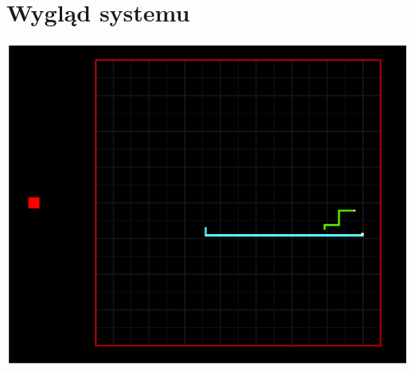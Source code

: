 \documentclass[12pt,a4paper]{article}
\begin{document}
\section{Wygląd systemu}
\includegraphics[scale=0.8]{media/Wyglad1}
\end{document}
